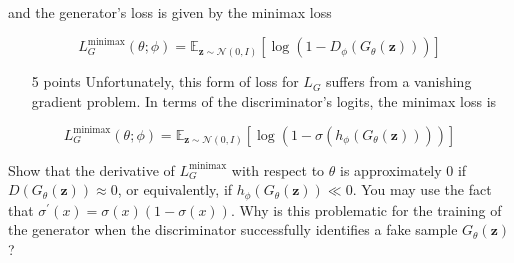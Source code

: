 \documentclass{article}
\theoremstyle{case}
\theoremstyle{definition}
\begin{document}
and the generator's loss is given by the minimax loss

$$
L_{G}^{\operatorname{minimax}}(\theta ; \phi)=\mathbb{E}_{\boldsymbol{z} \sim \mathcal{N}(0, I)}\left[\log \left(1-D_{\phi}\left(G_{\theta}(\boldsymbol{z})\right)\right)\right]
$$

\begin{enumerate}
  \item [5 points] Unfortunately, this form of loss for $L_{G}$ suffers from a vanishing gradient problem. In terms of the discriminator's logits, the minimax loss is
\end{enumerate}

$$
L_{G}^{\operatorname{minimax}}(\theta ; \phi)=\mathbb{E}_{\boldsymbol{z} \sim \mathcal{N}(0, I)}\left[\log \left(1-\sigma\left(h_{\phi}\left(G_{\theta}(\boldsymbol{z})\right)\right)\right)\right]
$$

Show that the derivative of $L_{G}^{\operatorname{minimax}}$ with respect to $\theta$ is approximately 0 if $D\left(G_{\theta}(\boldsymbol{z})\right) \approx 0$, or equivalently, if $h_{\phi}\left(G_{\theta}(\boldsymbol{z})\right) \ll 0$. You may use the fact that $\sigma^{\prime}(x)=\sigma(x)(1-\sigma(x))$. Why is this problematic for the training of the generator when the discriminator successfully identifies a fake sample $G_{\theta}(\boldsymbol{z})$ ?
\end{document}
